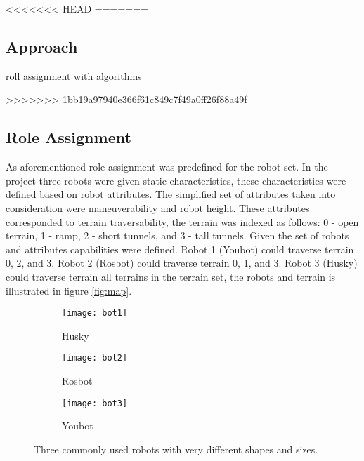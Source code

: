 <<<<<<< HEAD
=======
\subsection{Approach}
roll assignment with algorithms


>>>>>>> 1bb19a97940e366f61c849c7f49a0ff26f88a49f
\subsection{Role Assignment}
As aforementioned role assignment was predefined for the robot set. In the project three robots were given static characteristics, these characteristics were defined based on robot attributes. The simplified set of attributes taken into consideration were maneuverability and robot height. These attributes corresponded to terrain traversability, the terrain was indexed as follows: 0 - open terrain, 1 - ramp, 2 - short tunnels, and 3 - tall tunnels. Given the set of robots and attributes capabilities were defined. Robot 1 (Youbot) could traverse terrain 0, 2, and 3. Robot 2 (Rosbot) could traverse terrain 0, 1, and 3. Robot 3 (Husky) could traverse terrain all terrains in the terrain set, the robots and terrain is illustrated in figure \ref{fig:map}.


\begin{figure}
    \centering
    \begin{subfigure}[b]{0.15\textwidth}
        \texttt{[image: bot1]}
        \caption{Husky}
        \label{fig:bot1}
    \end{subfigure}
    \begin{subfigure}[b]{0.15\textwidth}
        \texttt{[image: bot2]}
        \caption{Rosbot}
        \label{fig:bot2}
    \end{subfigure}
    \begin{subfigure}[b]{0.15\textwidth}
        \texttt{[image: bot3]}
        \caption{Youbot}
        \label{fig:bot3}
    \end{subfigure}
    \caption{Three commonly used robots with very different shapes and sizes.}\label{fig:bots}
\end{figure}


